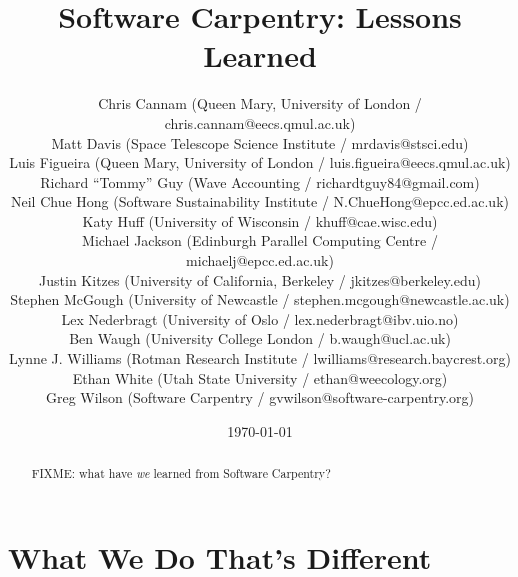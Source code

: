 \documentclass{article}
\begin{document}
\title{Software Carpentry: Lessons Learned}
\date{\today}

\author{
  Chris Cannam (Queen Mary, University of London / chris.cannam@eecs.qmul.ac.uk)\\
  Matt Davis (Space Telescope Science Institute / mrdavis@stsci.edu)\\
  Luis Figueira (Queen Mary, University of London / luis.figueira@eecs.qmul.ac.uk)\\
  Richard ``Tommy'' Guy (Wave Accounting / richardtguy84@gmail.com)\\
  Neil Chue Hong (Software Sustainability Institute / N.ChueHong@epcc.ed.ac.uk)\\
  Katy Huff (University of  Wisconsin / khuff@cae.wisc.edu)\\
  Michael Jackson (Edinburgh Parallel Computing Centre / michaelj@epcc.ed.ac.uk)\\
  Justin Kitzes (University of California, Berkeley / jkitzes@berkeley.edu)\\
  Stephen McGough (University of Newcastle / stephen.mcgough@newcastle.ac.uk) \\
  Lex Nederbragt (University of Oslo / lex.nederbragt@ibv.uio.no)\\
  Ben Waugh (University College London / b.waugh@ucl.ac.uk)\\
  Lynne J. Williams (Rotman Research Institute / lwilliams@research.baycrest.org)\\
  Ethan White (Utah State University / ethan@weecology.org)\\
  Greg Wilson (Software Carpentry / gvwilson@software-carpentry.org)
}

\maketitle

\begin{abstract}
FIXME: what have \emph{we} learned from Software Carpentry?
\end{abstract}

\section{What We Do That's Different}
\end{document}
